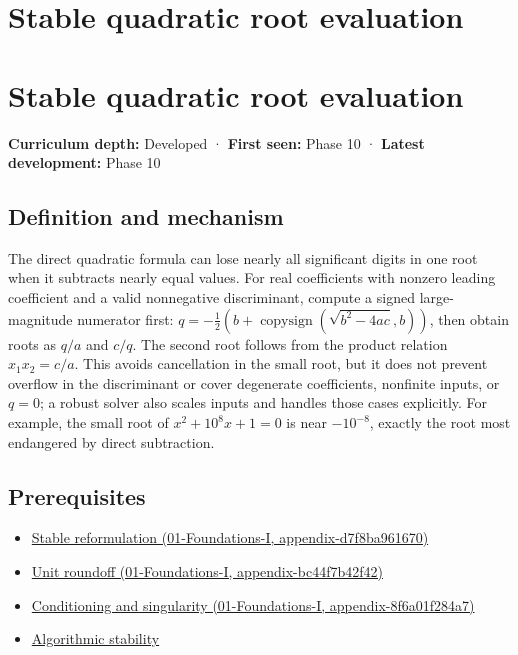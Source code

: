 \hypertarget{appendix-b9afba7f63e5}{}
\section*{Stable quadratic root evaluation}
\section{Stable quadratic root evaluation}\label{stable-quadratic-root-evaluation}

\textbf{Curriculum depth:} Developed · \textbf{First seen:} Phase 10 · \textbf{Latest development:} Phase 10

\subsection{Definition and mechanism}\label{definition-and-mechanism}

The direct quadratic formula can lose nearly all significant digits in one root when it subtracts nearly equal values. For real coefficients with nonzero leading coefficient and a valid nonnegative discriminant, compute a signed large-magnitude numerator first: \(q=-\frac12(b+\operatorname{copysign}(\sqrt{b^2-4ac},b))\), then obtain roots as \(q/a\) and \(c/q\). The second root follows from the product relation \(x_1x_2=c/a\). This avoids cancellation in the small root, but it does not prevent overflow in the discriminant or cover degenerate coefficients, nonfinite inputs, or \(q=0\); a robust solver also scales inputs and handles those cases explicitly. For example, the small root of \(x^2+10^8x+1=0\) is near \(-10^{-8}\), exactly the root most endangered by direct subtraction.

\subsection{Prerequisites}\label{prerequisites}

\begin{itemize}
\tightlist
\item
  \href{}{Stable reformulation (01-Foundations-I, appendix-d7f8ba961670)}
\item
  \href{}{Unit roundoff (01-Foundations-I, appendix-bc44f7b42f42)}
\item
  \href{}{Conditioning and singularity (01-Foundations-I, appendix-8f6a01f284a7)}
\item
  \hyperref[appendix-aa2bf0d79639]{Algorithmic stability}
\end{itemize}

